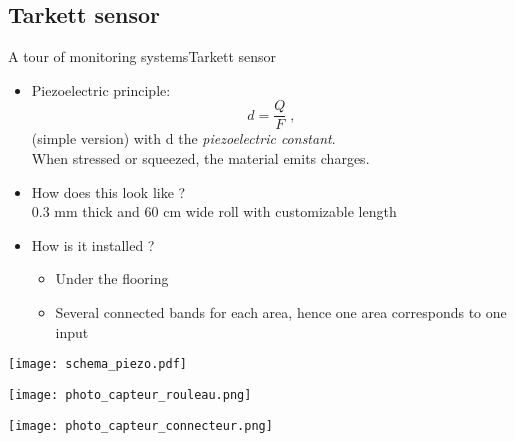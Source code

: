 \subsection{Tarkett sensor}
\begin{frame}{A tour of monitoring systems}{Tarkett sensor}
\begin{minipage}[t]{0.35\linewidth}
    \vspace{0pt}
    \begin{itemize}
        \item Piezoelectric principle: $$d = \frac{Q}{F}\;,$$ (simple version) with d the \emph{piezoelectric constant}.\\
        When stressed or squeezed, the material emits charges.\\
        \pause
        \item How does this look like ?\\
            0.3 mm thick and 60 cm wide roll with customizable length
        \pause
        \item How is it installed ?\\
            \begin{itemize}
                \item Under the flooring
                \item Several connected bands for each area, hence one area corresponds to one input
            \end{itemize}

    \end{itemize}
\end{minipage}\hfill
\begin{minipage}[t]{0.64\linewidth}
    \vspace{0pt}
    \centering
    \texttt{[image: schema\_piezo.pdf]}\\
    \begin{minipage}[t]{0.49\linewidth}
        \centering
        \texttt{[image: photo\_capteur\_rouleau.png]}\\
    \end{minipage}
    \begin{minipage}[t]{0.49\linewidth}
        \centering
        \texttt{[image: photo\_capteur\_connecteur.png]}\\
    \end{minipage}
    

\end{minipage}
\end{frame}

